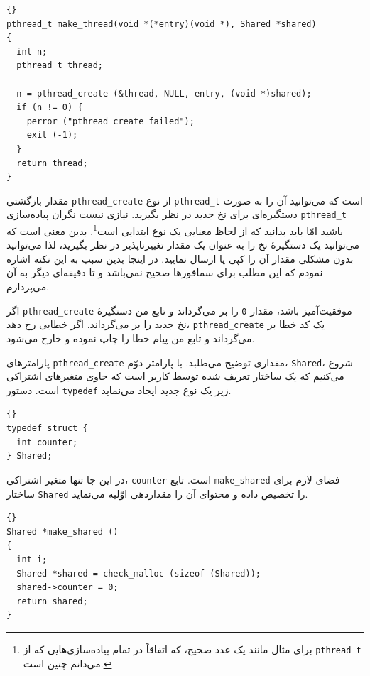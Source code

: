 \documentclass{book}
\begin{document}
\begin{latin}
\begin{lstlisting}[title={},escapeinside={}]{}
pthread_t make_thread(void *(*entry)(void *), Shared *shared)
{
  int n;
  pthread_t thread;

  n = pthread_create (&thread, NULL, entry, (void *)shared);
  if (n != 0) {
    perror ("pthread_create failed");
    exit (-1);
  }
  return thread;
}
\end{lstlisting}
\end{latin}
    مقدار بازگشتی  {\tt pthread\_create} از نوع  {\tt pthread\_t} است که می‌توانید آن را به صورت دستگیره‌ای 
    برای نخ جدید در نظر بگیرید. نیازی نیست  نگران پیاده‌سازی {\tt pthread\_t} باشید امّا باید بدانید که از لحاظ معنایی یک نوع ابتدایی است\footnote{%
    برای مثال مانند یک عدد صحیح، که  اتفاقاً در تمام پیاده‌سازی‌هایی که از {\tt pthread\_t} می‌دانم چنین است.}. 
    بدین معنی است که می‌توانید یک دستگیرهٔ نخ را به عنوان یک مقدار تغییرناپذیر در نظر بگیرید، لذا می‌توانید بدون مشکلی مقدار آن را کپی یا ارسال نمایید.
    در اینجا بدین سبب به این نکته اشاره نمودم که این مطلب برای سمافورها صحیح نمی‌باشد و تا دقیقه‌ای دیگر به آن می‌پردازم.

    اگر {\tt pthread\_create}  موفقیت‌آمیز باشد، مقدار {\tt 0}  را بر می‌گرداند و تابع من دستگیرهٔ نخ جدید را بر می‌گرداند. 
    اگر خطایی رخ دهد، {\tt pthread\_create}  یک کد خطا بر می‌گرداند و تابع من پیام خطا را چاپ نموده و خارج می‌شود. 


    پارامترهای {\tt pthread\_create}  مقداری توضیح می‌طلبد. با پارامتر دوّم، {\tt Shared}، شروع می‌کنیم که یک ساختار تعریف شده توسط کاربر است 
    که حاوی متغیرهای اشتراکی است. دستور {\tt typedef} زیر یک نوع جدید ایجاد می‌نماید. 

\begin{latin}
\begin{lstlisting}[title={}]{}
typedef struct {
  int counter;
} Shared;
\end{lstlisting}
\end{latin}

    در این جا تنها متغیر اشتراکی،  {\tt counter}  است. تابع {\tt make\_shared}  فضای لازم برای ساختار  {\tt Shared} را تخصیص داده و 
    محتوای آن را مقداردهی اوّلیه می‌نماید. 

\begin{latin}
\begin{lstlisting}[title={}]{}
Shared *make_shared ()
{
  int i;
  Shared *shared = check_malloc (sizeof (Shared));
  shared->counter = 0;
  return shared;
}
\end{lstlisting}
\end{latin}
\end{document}
